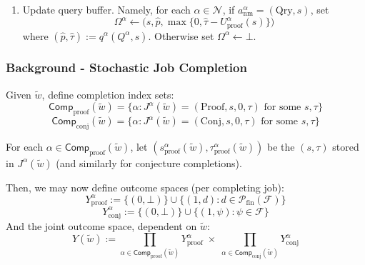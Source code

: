 \documentclass[letterpaper]{article} %
\begin{document}
\begin{enumerate}
Then propagate public additions to each private library to maintain the invariant $\mathcal L^0\subseteq \mathcal L^\beta$:
\[\mathcal C^\beta \leftarrow \mathcal C^\beta \cup (\mathcal C^0\setminus \mathcal C^0_{\text{old}})\]\[
\mathcal{RS}^\beta \leftarrow \mathcal{RS}^\beta \cup (\mathcal{RS}^0\setminus \mathcal{RS}^0_{\text{old}})\]
Also update for all $s\in \mathcal{RS}^0 \setminus \mathcal{RS}^0_\mathrm{old}$:
 \[\delta^\beta(s)\leftarrow\delta^0(s),\qquad \Theta^\beta(s)\leftarrow\Theta^0(s)\]
 \[Q^\beta \leftarrow \Delta^\beta(Q^\beta,(s,\Theta^0(s)))\]
 


\item Update query buffer. Namely, for each $\alpha\in\mathcal{N}$, if $a^\alpha_{\mathrm{nm}}=(\mathrm{Qry},s)$, set
\[\Omega^\alpha \leftarrow \big(s,\hat p,\max\{0,\hat\tau-U^\alpha_{\mathrm{proof}}(s)\}\big)\]
where $(\hat p,\hat\tau):=q^\alpha(Q^\alpha,s)$. Otherwise set $\Omega^\alpha\leftarrow \bot$.

\end{enumerate}

\subsubsection{Background - Stochastic Job Completion}

Given $\tilde w$, define completion index sets:
\[
    \mathsf{Comp}_{\mathrm{proof}}(\tilde w) = \{\alpha : J^\alpha(\tilde w)=(\mathrm{Proof},s,0,\tau)\text{ for some }s,\tau\}
\]
\[\mathsf{Comp}_{\mathrm{conj}}(\tilde w) = \{\alpha : J^\alpha(\tilde w)=(\mathrm{Conj},s,0,\tau)\text{ for some }s,\tau\}\]

For each $\alpha\in \mathsf{Comp}_{\mathrm{proof}}(\tilde w)$, let $(s^\alpha_{\mathrm{proof}}(\tilde w),\tau^\alpha_{\mathrm{proof}}(\tilde w))$ be the $(s,\tau)$ stored in $J^\alpha(\tilde w)$ (and similarly for conjecture completions).

Then, we may now define outcome spaces (per completing job):
\[Y^{\alpha}_{\mathrm{proof}} := \{(0,\bot)\}\cup\{(1,d): d\in\mathcal P_{\mathrm{fin}}(\mathcal F)\}\]
\[Y^{\alpha}_{\mathrm{conj}} := \{(0,\bot)\}\cup\{(1,\psi): \psi\in\mathcal F\}\]
And the joint outcome space, dependent on $\tilde w$:
\[Y(\tilde w)
:=
\prod_{\alpha\in\mathsf{Comp}_{\mathrm{proof}}(\tilde w)} Y^{\alpha}_{\mathrm{proof}}
\;\times\;
\prod_{\alpha\in\mathsf{Comp}_{\mathrm{conj}}(\tilde w)} Y^{\alpha}_{\mathrm{conj}}\]
\end{document}
